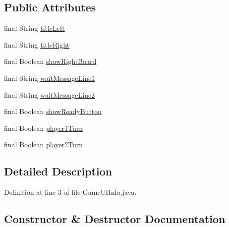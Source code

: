 \subsection*{Public Attributes}
\begin{DoxyCompactItemize}
\item 
final String \hyperlink{classpt_1_1up_1_1fe_1_1lpro1613_1_1sharedlib_1_1tuples_1_1_game_u_i_info_a979f065b051f0c2450588b3d0093112f}{title\+Left}
\item 
final String \hyperlink{classpt_1_1up_1_1fe_1_1lpro1613_1_1sharedlib_1_1tuples_1_1_game_u_i_info_af1e57c20040e1ef254be8a9f71a2565e}{title\+Right}
\item 
final Boolean \hyperlink{classpt_1_1up_1_1fe_1_1lpro1613_1_1sharedlib_1_1tuples_1_1_game_u_i_info_aacef642454df31ce436d72190e0a3c7a}{show\+Right\+Board}
\item 
final String \hyperlink{classpt_1_1up_1_1fe_1_1lpro1613_1_1sharedlib_1_1tuples_1_1_game_u_i_info_a088ba8d6af2fd0abdcee747a70784831}{wait\+Message\+Line1}
\item 
final String \hyperlink{classpt_1_1up_1_1fe_1_1lpro1613_1_1sharedlib_1_1tuples_1_1_game_u_i_info_aba46c97ac32127ca310d7c0a99206075}{wait\+Message\+Line2}
\item 
final Boolean \hyperlink{classpt_1_1up_1_1fe_1_1lpro1613_1_1sharedlib_1_1tuples_1_1_game_u_i_info_a5a17ae59542293a41bea27646da05f7d}{show\+Ready\+Button}
\item 
final Boolean \hyperlink{classpt_1_1up_1_1fe_1_1lpro1613_1_1sharedlib_1_1tuples_1_1_game_u_i_info_a0d33270d3239e508449e0804541611f8}{player1\+Turn}
\item 
final Boolean \hyperlink{classpt_1_1up_1_1fe_1_1lpro1613_1_1sharedlib_1_1tuples_1_1_game_u_i_info_abc6dbaf67552fdd9ced5e5725ae2685b}{player2\+Turn}
\end{DoxyCompactItemize}


\subsection{Detailed Description}


Definition at line 3 of file Game\+U\+I\+Info.\+java.



\subsection{Constructor \& Destructor Documentation}
\hypertarget{classpt_1_1up_1_1fe_1_1lpro1613_1_1sharedlib_1_1tuples_1_1_game_u_i_info_a186a08d459d5f3d54932137c06e023a6}{}\label{classpt_1_1up_1_1fe_1_1lpro1613_1_1sharedlib_1_1tuples_1_1_game_u_i_info_a186a08d459d5f3d54932137c06e023a6} 
